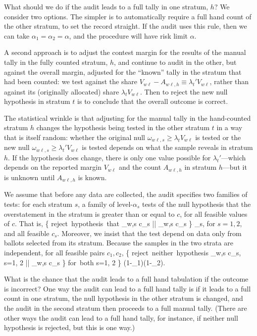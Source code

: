 What should we do if the audit leads to a full tally in one stratum, $h$?
We consider two options.
The simpler is to automatically require a full hand count of the other stratum, 
to set the record straight.
If the audit uses this rule, then we can take $\alpha_1 = \alpha_2 = \alpha$, and the procedure will have
risk limit $\alpha$.

A second approach is to adjust the contest margin for the results of the manual tally in the
fully counted stratum, $h$, and continue to audit in the other, 
but against the overall margin, adjusted for the ``known'' tally in the stratum that had 
been counted: we test against the share $V_{w\ell} - A_{w\ell,h} \equiv \lambda_t' V_{w\ell}$, rather than 
against its (originally allocated) share $\lambda_t V_{w\ell}$.
Then to reject the new null hypothesis in stratum $t$ is to conclude that the overall outcome is correct.

The statistical wrinkle is that adjusting for the manual tally in the hand-counted stratum $h$
changes the hypothesis being tested in the other stratum $t$
in a way that is itself random:
whether the original null $\omega_{w\ell,s} \ge \lambda_t V_{w\ell}$ is tested
or the new null $\omega_{w\ell,s} \ge \lambda_t' V_{w\ell}$ is tested depends on what the 
sample reveals in stratum $h$.
If the hypothesis does change, there is only one value possible for $\lambda_t'$---which
depends on the reported margin $V_{w\ell}$ and the count $A_{w\ell,h}$ in 
stratum $h$---but it is unknown until $A_{w\ell,h}$ is known.

We assume that before any data are collected, the audit specifies two families of tests:
for each stratum $s$, a family of level-$\alpha_s$ tests of the null hypothesis that 
the overstatement in the stratum is greater than or equal to $c$, for all feasible values of $c$.
That is,
\beq
    \Pr \{ \mbox{reject hypothesis that} \omega_{w\ell,s} \ge c_s || \omega_{w\ell,s} \ge c_s \} \le \alpha_s,
\eeq
for $s = 1, 2$, and all feasible $c_s$.
Moreover, we insist that the test depend on data only from ballots selected from its stratum.
Because the samples in the two strata are independent, for all feasible pairs $c_1, c_2$,
\beq \label{eq:stratum_families}
    \Pr \{ \mbox{reject neither hypothesis} \omega_{w\ell,s} \ge c_s,\;\; s=1, 2 ||
       \omega_{w\ell,s} \ge c_s \} \mbox{for both} s=1, 2 \} \ge (1-\alpha_1)(1-\alpha_2).
\eeq

What is the chance that the audit leads to a full hand tabulation if the outcome is incorrect?
One way the audit can lead to a full hand tally is if it leads to a full count in one stratum, 
the null hypothesis in the other stratum is changed, and the audit in the second 
stratum then proceeds to a full manual tally.
(There are other ways the audit can lead to a full hand tally, for instance, if neither
null hypothesis is rejected, but this is one way.)

